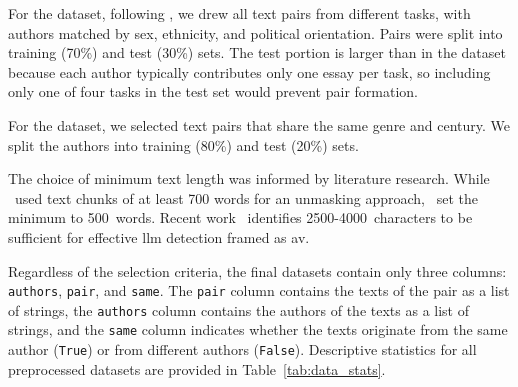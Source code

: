 For the \dataStudent{} dataset, following \citet{koppel_determining_2014}, we drew all text pairs from different tasks, with authors matched by sex, ethnicity, and political orientation. Pairs were split into training (70\%) and test (30\%) sets.
The test portion is larger than in the \dataBlog{} dataset because each author typically contributes only one essay per task, so including only one of four tasks in the test set would prevent pair formation.

For the \dataGutenberg{} dataset, we selected text pairs that share the same genre and century.
We split the authors into training (80\%) and test (20\%) sets.

The choice of minimum text length was informed by literature research.
While \citet{bevendorff_generalizing_2019}\ used text chunks of at least 700 words for an unmasking approach, \citet{koppel_authorship_2004}\ set the minimum to \num{500}~words.
Recent work~\citep{llm_detection_av_2025} identifies \num{2500}-\num{4000}~characters to be sufficient for effective \ac{llm} detection framed as \ac{av}.

Regardless of the selection criteria, the final datasets contain only three columns: \texttt{authors}, \texttt{pair}, and \texttt{same}.
The \texttt{pair} column contains the texts of the pair as a list of strings,
the \texttt{authors} column contains the authors of the texts as a list of strings,
and the \texttt{same} column indicates whether the texts originate from the same author (\texttt{True}) or from different authors (\texttt{False}).
Descriptive statistics for all preprocessed datasets are provided in Table~\ref{tab:data_stats}.



